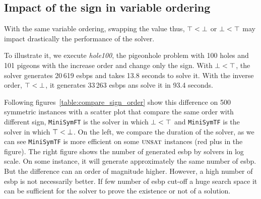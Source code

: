 \subsection{Impact of the sign in variable ordering}
With the same variable ordering, swapping the value thus, $\top < \bot$ or $\bot < \top$
may impact drastically the performance of the solver.

To illustrate it, we execute \textit{hole100}, the pigeonhole problem with 100 holes and 101 pigeons with 
the increase order and change only the sign.
With  $\bot < \top$, the solver generates 20\,619 esbps and takes 13.8 seconds to solve it.
With the inverse order, $\top < \bot$, it generates 33\,263 esbps ans solve it in 93.4 seconds.

Following figures~\ref{table:compare_sign_order} show this difference on 500 symmetric instances with
a scatter plot that compare the same order with different sign, \texttt{MiniSymFT} is the solver in which $\bot < \top$ and  \texttt{MiniSymTF} is the solver in which $\top < \bot$.
On the left, we compare the duration of the solver, as we can see \texttt{MiniSymTF} is more efficient on some $\textsc{unsat}$ instances (red plus in the figure).
The right figure shows the number of generated esbp by solvers in log scale. On some instance, it will generate 
approximately the same number of esbp. But the difference can an order of magnitude higher.
However, a high number of esbp is not necessarily better. If few number of esbp cut-off a huge search space it can be sufficient for the solver to prove the existence or not of a solution.



